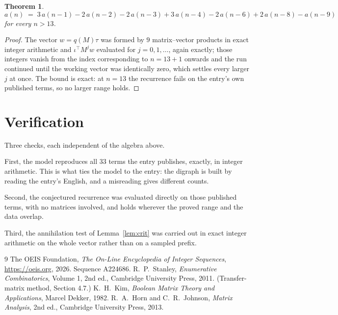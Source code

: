 \documentclass[11pt,a4paper]{article}
\theoremstyle{plain}
\newtheorem{theorem}{Theorem}
\theoremstyle{definition}
\begin{document}
\begin{theorem}
\[
a(n)\;=\;3\,a(n-1) - 2\,a(n-2) - 2\,a(n-3) + 3\,a(n-4) - 2\,a(n-6) + 2\,a(n-8) - a(n-9)
\]
for every $n>13$.
\end{theorem}

\begin{proof}
The vector $w=q(M)\tau$ was formed by $9$ matrix--vector products in exact integer
arithmetic and $\iota^{\!\top}M^{j}w$ evaluated for $j=0,1,\dots$, again exactly; those
integers vanish from the index corresponding to $n=13+1$ onwards and the run continued
until the working vector was identically zero, which settles every larger $j$ at once. The bound is exact: at $n=13$ the recurrence fails on the entry's own published terms, so no larger range holds.
\end{proof}

\section{Verification}

Three checks, each independent of the algebra above.

First, the model reproduces all $33$ terms the entry publishes, exactly, in integer
arithmetic. This is what ties the model to the entry: the digraph is built by reading the
entry's English, and a misreading gives different counts.

Second, the conjectured recurrence was evaluated directly on those published terms, with no
matrices involved, and holds wherever the proved range and the data overlap.

Third, the annihilation test of Lemma~\ref{lem:crit} was carried out in exact integer
arithmetic on the whole vector rather than on a sampled prefix.

\begin{thebibliography}{9}
 The OEIS Foundation, \emph{The On-Line Encyclopedia of Integer
Sequences}, \url{https://oeis.org}, 2026. Sequence A224686.
 R.~P.~Stanley, \emph{Enumerative Combinatorics}, Volume 1, 2nd ed.,
Cambridge University Press, 2011. (Transfer-matrix method, Section 4.7.)
 K.~H.~Kim, \emph{Boolean Matrix Theory and Applications}, Marcel Dekker,
1982.
 R.~A.~Horn and C.~R.~Johnson, \emph{Matrix Analysis}, 2nd ed., Cambridge
University Press, 2013.
\end{thebibliography}
\end{document}
